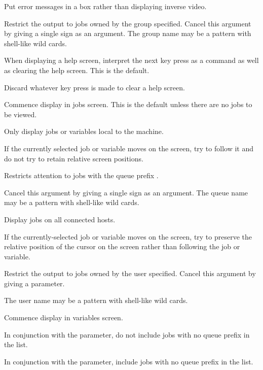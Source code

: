 
Put error messages in a box rather than displaying inverse video.


Restrict the output to jobs owned by the group specified.
Cancel this argument by giving a single \exampletext{{}-} sign
as an argument. The group name may be a pattern with shell-like wild cards.


When displaying a help screen, interpret the next key press as a command as well as clearing the help screen. This is the
default.


Discard whatever key press is made to clear a help screen.


Commence display in jobs screen. This is the default unless there are no jobs to be viewed.


Only display jobs or variables local to the machine.


If the currently selected job or variable moves on the screen, try to follow it and do not try to retain relative screen positions.


Restricts attention to jobs with the queue prefix .

Cancel this argument by giving a single \exampletext{{}-} sign as an argument. The queue name may be a pattern with shell-like wild
cards.


Display jobs on all connected hosts.


If the currently-selected job or variable moves on the screen, try to preserve the
relative position of the cursor on the screen rather than following the
job or variable.


Restrict the output to jobs owned by the user specified. Cancel this argument by giving a \exampletext{{}-} parameter.

The user name may be a pattern with shell-like wild cards.


Commence display in variables screen.


In conjunction with the  parameter, do not include jobs with no queue prefix in the list.


In conjunction with the  parameter, include jobs with no queue prefix in the list.


